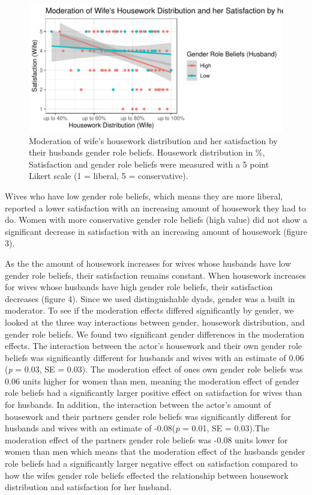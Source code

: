 \documentclass[
  man,floatsintext]{apa6}
\begin{document}
\begin{figure}
\centering
\includegraphics{Final_Paper_files/figure-latex/unnamed-chunk-57-1.pdf}
\caption{\label{fig:unnamed-chunk-57}Moderation of wife's housework distribution and her satisfaction by their husbands gender role beliefs. Housework distribution in \%, Satisfaction and gender role beliefs were measured with a 5 point Likert scale (1 = liberal, 5 = conservative).}
\end{figure}

Wives who have low gender role beliefs, which means they are more liberal, reported a lower satisfaction with an increasing amount of housework they had to do. Women with more conservative gender role beliefs (high value) did not show a significant decrease in satisfaction with an increasing amount of housework (figure 3).

As the the amount of housework increases for wives whose husbands have low gender role beliefs, their satisfaction remains constant. When housework increases for wives whose husbands have high gender role beliefs, their satisfaction decreases (figure 4).
Since we used distinguishable dyads, gender was a built in moderator. To see if the moderation effects differed significantly by gender, we looked at the three way interactions between gender, housework distribution, and gender role beliefs. We found two significant gender differences in the moderation effects. The interaction between the actor's housework and their own gender role beliefs was significantly different for husbands and wives with an estimate of 0.06 (\emph{p} = 0.03, SE = 0.03). The moderation effect of ones own gender role beliefs was 0.06 units higher for women than men, meaning the moderation effect of gender role beliefs had a significantly larger positive effect on satisfaction for wives than for husbands.
In addition, the interaction between the actor's amount of housework and their partners gender role beliefs was significantly different for husbands and wives with an estimate of -0.08(\emph{p} = 0.01, SE = 0.03).The moderation effect of the partners gender role beliefs was -0.08 units lower for women than men which means that the moderation effect of the husbands gender role beliefs had a significantly larger negative effect on satisfaction compared to how the wifes gender role beliefs effected the relationship between housework distribution and satisfaction for her husband.
\end{document}
